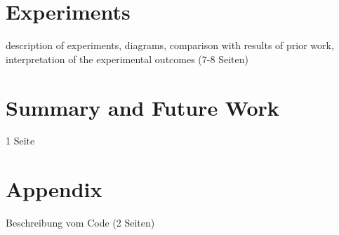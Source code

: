 \documentclass[
     12pt,         %
     a4paper,      %
     DIV=14,        %
     ]{scrreprt}
\begin{document}

\chapter{Experiments}
\label{chap:experiments}

description of experiments, diagrams, comparison with results of prior work, interpretation of the experimental outcomes (7-8 Seiten)

\chapter{Summary and Future Work}
\label{chap:summary}
1 Seite


\chapter{Appendix}
\label{chap:appendix}
Beschreibung vom Code (2 Seiten)












\end{document}
